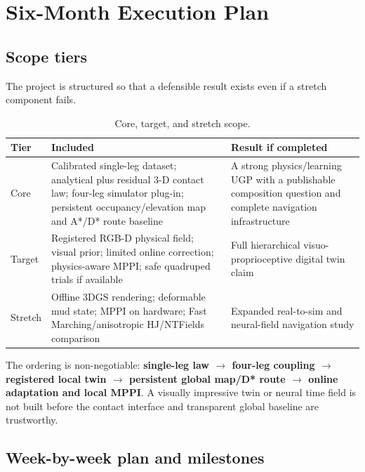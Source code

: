 \section{Six-Month Execution Plan}
\label{sec:execution}

\subsection{Scope tiers}

The project is structured so that a defensible result exists even if a stretch component fails.

\begin{table}[ht]
\centering
\caption{Core, target, and stretch scope.}
\label{tab:scope}
\begin{tabularx}{\textwidth}{@{}L{25mm}Y Y@{}}
\toprule
\textbf{Tier} & \textbf{Included} & \textbf{Result if completed}\\
\midrule
Core & Calibrated single-leg dataset; analytical plus residual 3-D contact law; four-leg simulator plug-in; persistent occupancy/elevation map and A*/D* route baseline & A strong physics/learning UGP with a publishable composition question and complete navigation infrastructure\\
\addlinespace[2pt]
Target & Registered RGB-D physical field; visual prior; limited online correction; physics-aware MPPI; safe quadruped trials if available & Full hierarchical visuo-proprioceptive digital twin claim\\
\addlinespace[2pt]
Stretch & Offline 3DGS rendering; deformable mud state; MPPI on hardware; Fast Marching/anisotropic HJ/NTFields comparison & Expanded real-to-sim and neural-field navigation study\\
\bottomrule
\end{tabularx}
\end{table}

The ordering is non-negotiable: \textbf{single-leg law $\rightarrow$ four-leg coupling $\rightarrow$ registered local twin $\rightarrow$ persistent global map/D* route $\rightarrow$ online adaptation and local MPPI}. A visually impressive twin or neural time field is not built before the contact interface and transparent global baseline are trustworthy.

\subsection{Week-by-week plan and milestones}

